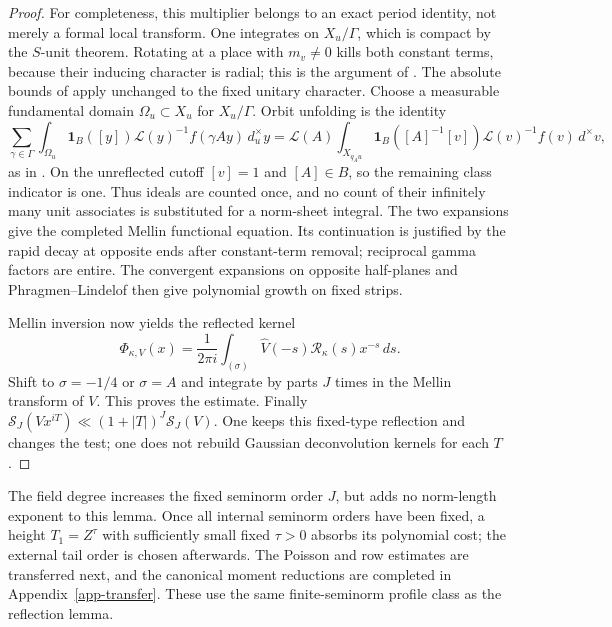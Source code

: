 \documentclass[11pt,a4paper]{article}
\theoremstyle{remark}\newtheorem{remark}[theorem]{Remark}
\newcommand{\one}{\mathbf 1}
\numberwithin{equation}{section}
\begin{document}
\begin{proof}
For completeness, this multiplier belongs to an exact period
identity, not merely a formal local transform.  One integrates on
$X_u/\Gamma$, which is compact by the $S$-unit theorem.
Rotating at a place with $m_v\ne0$ kills both constant terms,
because their inducing character is radial; this is the argument
of \cite[(6.8)]{P}.  The absolute bounds of
\cite[Lemma 5.4]{P} apply unchanged to the fixed unitary character.
Choose a measurable fundamental domain $\Omega_u\subset X_u$ for
$X_u/\Gamma$. Orbit unfolding is the identity
\[
 \sum_{\gamma\in\Gamma}\int_{\Omega_u}
 \one_B([y])\mathscr L(y)^{-1} f(\gamma Ay)\,d_u^\times y
 =\mathscr L(A)\int_{X_{q_Au}}\one_B([A]^{-1}[v])
                    \mathscr L(v)^{-1}f(v)\,d^\times v,
\]
as in \cite[(6.13)]{P}.  On the unreflected cutoff $[v]=1$
and $[A]\in B$, so the remaining class indicator is one.
Thus ideals are counted once, and no count of their infinitely many
unit associates is substituted for a norm-sheet integral.
The two expansions give the completed Mellin functional equation.
Its continuation is justified by the rapid decay at opposite ends
after constant-term removal; reciprocal gamma factors are entire.
The convergent expansions on opposite half-planes and
Phragmen--Lindelof then give polynomial growth on fixed strips.

Mellin inversion now yields the reflected kernel
\[
 \Phi_{\kappa,V}(x)=\frac1{2\pi i}\int_{(\sigma)}
       \widehat V(-s)\mathcal R_\kappa(s)x^{-s}\,ds.
\]
Shift to $\sigma=-1/4$ or $\sigma=A$ and integrate by parts $J$
times in the Mellin transform of $V$.  This proves the estimate.
Finally $\mathcal S_J(Vx^{iT})\ll(1+|T|)^J\mathcal S_J(V)$.
One keeps this fixed-type reflection and changes the test; one does
not rebuild Gaussian deconvolution kernels for each $T$.
\end{proof}

The field degree increases the fixed seminorm order $J$, but adds
no norm-length exponent to this lemma.  Once all internal seminorm
orders have been fixed, a height $T_1=Z^\tau$ with sufficiently small
fixed $\tau>0$ absorbs its polynomial cost; the external tail order
is chosen afterwards.  The Poisson and row estimates are transferred next, and the
canonical moment reductions are completed in
Appendix~\ref{app-transfer}. These use the same finite-seminorm
profile class as the reflection lemma.
\end{document}
